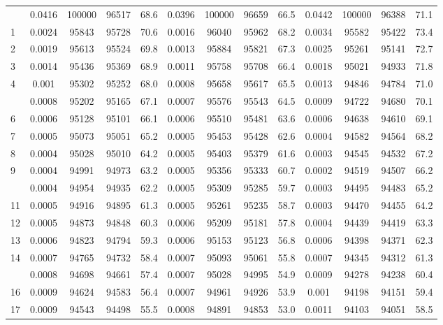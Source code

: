 \documentclass[
  14pt,
]{article}
\begin{document}
\begin{longtable}[t]{lcccccccccccc}
\endfoot
\bottomrule
\endlastfoot
0 & 0.0416 & 100000 & 96517 & 68.6 & 0.0396 & 100000 & 96659 & 66.5 & 0.0442 & 100000 & 96388 & 71.1\\
1 & 0.0024 & 95843 & 95728 & 70.6 & 0.0016 & 96040 & 95962 & 68.2 & 0.0034 & 95582 & 95422 & 73.4\\
2 & 0.0019 & 95613 & 95524 & 69.8 & 0.0013 & 95884 & 95821 & 67.3 & 0.0025 & 95261 & 95141 & 72.7\\
3 & 0.0014 & 95436 & 95369 & 68.9 & 0.0011 & 95758 & 95708 & 66.4 & 0.0018 & 95021 & 94933 & 71.8\\
4 & 0.001 & 95302 & 95252 & 68.0 & 0.0008 & 95658 & 95617 & 65.5 & 0.0013 & 94846 & 94784 & 71.0\\
\addlinespace
5 & 0.0008 & 95202 & 95165 & 67.1 & 0.0007 & 95576 & 95543 & 64.5 & 0.0009 & 94722 & 94680 & 70.1\\
6 & 0.0006 & 95128 & 95101 & 66.1 & 0.0006 & 95510 & 95481 & 63.6 & 0.0006 & 94638 & 94610 & 69.1\\
7 & 0.0005 & 95073 & 95051 & 65.2 & 0.0005 & 95453 & 95428 & 62.6 & 0.0004 & 94582 & 94564 & 68.2\\
8 & 0.0004 & 95028 & 95010 & 64.2 & 0.0005 & 95403 & 95379 & 61.6 & 0.0003 & 94545 & 94532 & 67.2\\
9 & 0.0004 & 94991 & 94973 & 63.2 & 0.0005 & 95356 & 95333 & 60.7 & 0.0002 & 94519 & 94507 & 66.2\\
\addlinespace
10 & 0.0004 & 94954 & 94935 & 62.2 & 0.0005 & 95309 & 95285 & 59.7 & 0.0003 & 94495 & 94483 & 65.2\\
11 & 0.0005 & 94916 & 94895 & 61.3 & 0.0005 & 95261 & 95235 & 58.7 & 0.0003 & 94470 & 94455 & 64.2\\
12 & 0.0005 & 94873 & 94848 & 60.3 & 0.0006 & 95209 & 95181 & 57.8 & 0.0004 & 94439 & 94419 & 63.3\\
13 & 0.0006 & 94823 & 94794 & 59.3 & 0.0006 & 95153 & 95123 & 56.8 & 0.0006 & 94398 & 94371 & 62.3\\
14 & 0.0007 & 94765 & 94732 & 58.4 & 0.0007 & 95093 & 95061 & 55.8 & 0.0007 & 94345 & 94312 & 61.3\\
\addlinespace
15 & 0.0008 & 94698 & 94661 & 57.4 & 0.0007 & 95028 & 94995 & 54.9 & 0.0009 & 94278 & 94238 & 60.4\\
16 & 0.0009 & 94624 & 94583 & 56.4 & 0.0007 & 94961 & 94926 & 53.9 & 0.001 & 94198 & 94151 & 59.4\\
17 & 0.0009 & 94543 & 94498 & 55.5 & 0.0008 & 94891 & 94853 & 53.0 & 0.0011 & 94103 & 94051 & 58.5\\

\end{longtable}
\end{document}
